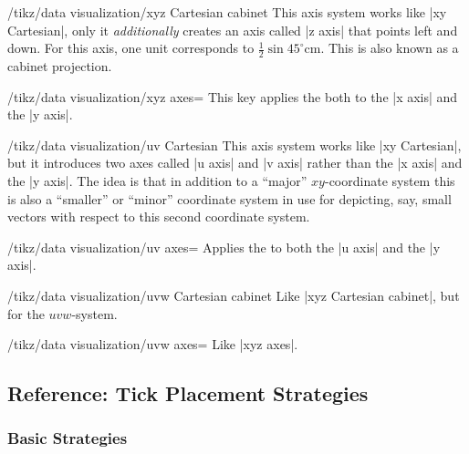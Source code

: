 \begin{key}{/tikz/data visualization/xyz Cartesian cabinet}
  This axis system works like |xy Cartesian|, only it
  \emph{additionally} creates an axis called |z axis| that points left
  and down. For this axis, one unit corresponds to $\frac{1}{2}\sin
  45^\circ\mathrm{cm}$. This is also known as a cabinet projection.
  
  \begin{key}{/tikz/data visualization/xyz axes=}
    This key applies the  both to the |x axis| and the
    |y axis|.   
  \end{key}

\end{key}


\begin{key}{/tikz/data visualization/uv Cartesian}
  This axis system works like |xy Cartesian|, but it introduces two
  axes called |u axis| and |v axis| rather than the |x axis| and the
  |y axis|. The idea is that in addition to a ``major''
  $xy$-coordinate system this is also a ``smaller'' or ``minor''
  coordinate system in use for depicting, say, small vectors with
  respect to this second coordinate system.
  
  \begin{key}{/tikz/data visualization/uv axes=}
    Applies the  to both the |u axis| and the |y axis|.
  \end{key}

\end{key}

\begin{key}{/tikz/data visualization/uvw Cartesian cabinet}
  Like |xyz Cartesian cabinet|, but for the $uvw$-system.
  
  \begin{key}{/tikz/data visualization/uvw axes=}
    Like |xyz axes|.
  \end{key}
\end{key}



\subsection{Reference: Tick Placement Strategies}
\label{section-dv-tick-placement-strategies}


\subsubsection{Basic Strategies}

